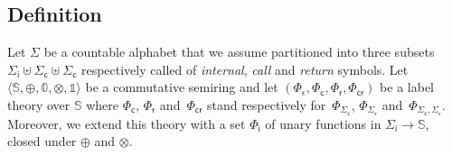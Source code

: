 \documentclass[runningheads]{llncs}
\def\<#1>{\langle #1 \rangle}
\newcommand{\Semiring}{\mathbb{S}}
\newcommand{\zero}{\mathbb{0}}
\newcommand{\one}{\mathbb{1}}
\newcommand{\call}[1]{\ensuremath #1} %
\newcommand{\return}[1]{\ensuremath #1} %
\def\Sigmai{{\Sigma_\mathsf{i}}}
\def\Sigmac{{\Sigma_\mathsf{c}}}
\def\Sigmar{{\Sigma_\mathsf{r}}}
\def\Phii{{\Phi_\mathsf{i}}}
\def\Phic{{\Phi_\mathsf{c}}}
\def\Phir{{\Phi_\mathsf{r}}}
\def\Phicr{{\Phi_\mathsf{cr}}}
\begin{document}
\subsection{Definition}
Let $\Sigma$ be a countable alphabet 
that we assume partitioned into three subsets 
$\Sigmai \uplus \Sigmac \uplus \Sigmac$ 
respectively called of \emph{internal}, \emph{call} and \emph{return}
symbols.
Let~$\< \Semiring, \oplus, \zero, \otimes, \one>$ be a commutative semiring and  
let  $(\Phi_\epsilon, \Phic, \Phir, \Phicr)$ be a label theory over $\Semiring$
where $\Phic$, $\Phir$ and~$\Phicr$ stand respectively 
for~$\Phi_\Sigmac$, $\Phi_\Sigmar$ and~$\Phi_{\Sigmac, \Sigmar}$.
%
Moreover, we extend this theory with a set $\Phii$ 
of unary functions in $\Sigmai \to \Semiring$,
closed under $\oplus$ and $\otimes$.
\end{document}
